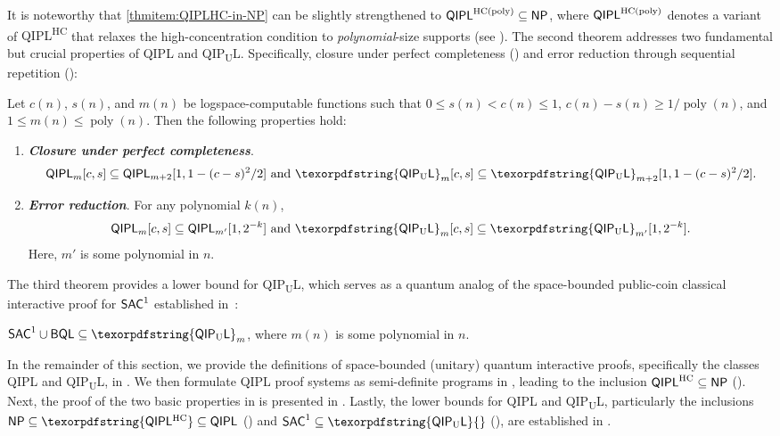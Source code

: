 \documentclass[10pt,a4paper]{article}
\numberwithin{equation}{section}
\numberwithin{figure}{section}
\newcommand{\NP}{\textnormal{\textsf{NP}}\xspace}
\newcommand{\QIPL}{\textnormal{\textsf{QIPL}}\xspace}
\newcommand{\QIPUL}{\texorpdfstring{\textnormal{\textsf{QIP}\textsubscript{\textnormal{U}}\textsf{L}}}\xspace}
\newcommand{\QIPLHC}{\texorpdfstring{\textnormal{\textsf{QIPL}\textsuperscript{\textnormal{HC}}}}\xspace}
\newcommand{\HC}{\mathrm{HC}}
\newcommand{\BQL}{\textnormal{\textsf{BQL}}\xspace}
\newcommand{\SAC}{\textnormal{\textsf{SAC}}\xspace}
\DeclareMathOperator\poly{poly}
\begin{document}
It is noteworthy that \ref{thmitem:QIPLHC-in-NP} can be slightly strengthened to $\QIPL^{\HC(\poly)} \subseteq \NP$, where $\QIPL^{\HC(\poly)}$ denotes a variant of \QIPLHC{} that relaxes the high-concentration condition to \textit{polynomial}-size supports (see ).
The second theorem addresses two fundamental but crucial properties of \QIPL{} and \QIPUL{}. Specifically, closure under perfect completeness () and error reduction through sequential repetition (): 

\begin{theorem}[Basic properties for \QIPL{} and \QIPUL{}]
    \label{thm:QIPL-basic-properties}
    Let $c(n)$, $s(n)$, and $m(n)$ be logspace-computable functions such that $0 \leq s(n) < c(n) \leq 1$, $c(n) - s(n) \geq 1/\poly(n)$, and $1 \leq m(n) \leq \poly(n)$. Then the following properties hold:
    \begin{enumerate}[label={\upshape(\arabic*)}, topsep=0.33em, itemsep=0.33em, parsep=0.33em]
        \item \textbf{\emph{Closure under perfect completeness}}.         \label{thmitem:QIPL-perfect-completeness}
        \[ \QIPL_m[c,s] \subseteq \QIPL_{m+2}[1,1-(c-s)^2/2] \text{ and } \QIPUL_m[c,s] \subseteq \QIPUL_{m+2}[1,1-(c-s)^2/2]. \]
        \item \textbf{\emph{Error reduction}}. For any polynomial $k(n)$, 
        \[ \QIPL_m[c,s] \subseteq \QIPL_{m'}[1,2^{-k}] \text{ and } \QIPUL_m[c,s] \subseteq \QIPUL_{m'}[1,2^{-k}]. \]
        Here, $m'$ is some polynomial in $n$. \label{thmitem:QIPL-error-reduction}
    \end{enumerate}
\end{theorem}

The third theorem provides a lower bound for \QIPUL{}, which serves as a quantum analog of the space-bounded public-coin classical interactive proof for $\SAC^1$ established in~\cite{Fortnow89}: 

\begin{theorem}
    \label{thm:LOGCFL-in-QIPUL}
    $\SAC^1 \cup \BQL \subseteq \QIPUL_m$, where $m(n)$ is some polynomial in $n$.
\end{theorem}


\vspace{1em}
In the remainder of this section, we provide the definitions of space-bounded (unitary) quantum interactive proofs, specifically the classes \QIPL{} and \QIPUL{}, in . 
We then formulate \QIPL{} proof systems as semi-definite programs in , leading to the inclusion $\QIPL^\HC \subseteq \NP$ (). 
Next, the proof of the two basic properties in  is presented in . 
Lastly, the lower bounds for \QIPL{} and \QIPUL{}, particularly the inclusions $\NP \subseteq \QIPLHC \subseteq \QIPL$ () and $\SAC^1 \subseteq \QIPUL{}$ (), are established in . 
\end{document}
